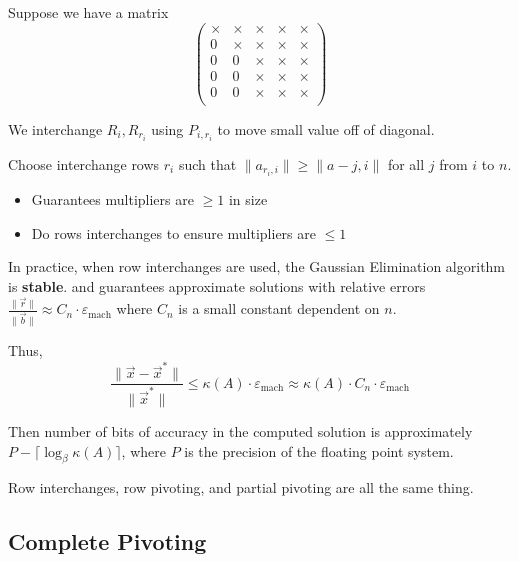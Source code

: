 Suppose we have a matrix \[
    \begin{pmatrix}
        \times & \times & \times & \times & \times \\
        0      & \times & \times & \times & \times \\
        0      & 0      & \times & \times & \times \\
        0      & 0      & \times & \times & \times \\
        0      & 0      & \times & \times & \times \\
    \end{pmatrix}
\]

We interchange \( R_i, R_{r_i} \) using \( P_{i, r_i} \) to move small value off of diagonal.

Choose interchange rows \( r_i \) such that \( \| a_{r_i, i} \| \geq \| a -{j, i} \| \) for all \( j \) from \( i \) to \( n \).

\begin{itemize}
    \item Guarantees multipliers are \( \geq 1 \) in size
    \item Do rows interchanges to ensure multipliers are \( \leq 1 \)
\end{itemize}

\begin{note}[Fact]
    In practice, when row interchanges are used, the Gaussian Elimination algorithm is \textbf{stable}. and guarantees approximate solutions with relative errors \( \frac{\| \vec{r} \|}{\| \vec{b} \|} \approx C_n \cdot \varepsilon_{\text{mach}} \) where \( C_n \) is a small constant dependent on \( n \).

    Thus, \[
        \frac{\| \vec{x} - \vec{x}^* \|}{ \| \vec{x}^* \|} \leq \kappa(A) \cdot \varepsilon_{\text{mach}} \approx \kappa(A) \cdot C_n \cdot \varepsilon_{\text{mach}}
    \]
\end{note}

\begin{remark}
    Then number of bits of accuracy in the computed solution is approximately \( P - \lceil \log_{\beta} \kappa(A) \rceil \), where \( P \) is the precision of the floating point system.
\end{remark}

\begin{remark}[Terms]
    Row interchanges, row pivoting, and partial pivoting are all the same thing.
\end{remark}

\subsection{Complete Pivoting}

